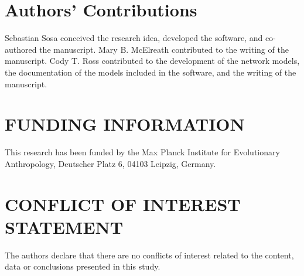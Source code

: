 \documentclass[num-refs]{wiley-article}
\begin{document}
\section*{Authors' Contributions}
Sebastian Sosa conceived the research idea, developed the software, and co-authored the manuscript. Mary B. McElreath contributed to the writing of the manuscript. Cody T. Ross contributed to the development of the network models, the documentation of the models included in the software, and the writing of the manuscript.


\section*{FUNDING INFORMATION}
This research has been funded by the Max Planck Institute for Evolutionary Anthropology, Deutscher Platz 6, 04103 Leipzig, Germany.

\section*{CONFLICT OF INTEREST STATEMENT}
The authors declare that there are no conflicts of interest related to the content, data or conclusions presented in this study.

\printendnotes


\end{document}

